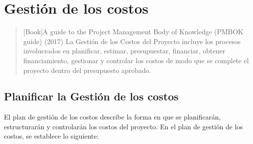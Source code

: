 \chapter{Gestión de los costos}

\begin{quotation}[Book]{A guide to the Project Management Body of Knowledge (PMBOK guide) (2017)}
La Gestión de los Costos del Proyecto incluye los procesos involucrados en planificar, estimar, presupuestar, financiar, obtener financiamiento, gestionar y controlar los costos de modo que se complete el proyecto dentro del presupuesto aprobado. \cite{pmbok}
\end{quotation}

\begin{abstract}
Se va a realizar de forma detallada la planificación de los costes, de forma que quede claro los recursos necesarios para llevar a cabo el proyecto.
\end{abstract}

\clearpage

\section{Planificar la Gestión de los costos}
El plan de gestión de los costos describe la forma en que se planificarán, estructurarán y controlarán los costos del proyecto.
En el plan de gestión de los costos, se establece lo siguiente:

